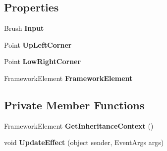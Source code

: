 \subsection*{Properties}
\begin{DoxyCompactItemize}
\item 
\mbox{\label{class_wpf_handler_1_1_u_i_1_1_effects_1_1_rect_blur_effect_ab0fee53cfe9bd6fd6a3ba991a2c024a3}} 
Brush {\bfseries Input}
\item 
\mbox{\label{class_wpf_handler_1_1_u_i_1_1_effects_1_1_rect_blur_effect_a7a8ff424f98797d72aa8acea72f45b89}} 
Point {\bfseries Up\+Left\+Corner}
\item 
\mbox{\label{class_wpf_handler_1_1_u_i_1_1_effects_1_1_rect_blur_effect_ab96f47536e8fe94f27c24072d1f462a5}} 
Point {\bfseries Low\+Right\+Corner}
\item 
\mbox{\label{class_wpf_handler_1_1_u_i_1_1_effects_1_1_rect_blur_effect_a16fb661a9b5f9f2c7a59eba0bca46198}} 
Framework\+Element {\bfseries Framework\+Element}
\end{DoxyCompactItemize}
\subsection*{Private Member Functions}
\begin{DoxyCompactItemize}
\item 
\mbox{\label{class_wpf_handler_1_1_u_i_1_1_effects_1_1_rect_blur_effect_aa60afd4d911b66bd47a6bbd8df16689a}} 
Framework\+Element {\bfseries Get\+Inheritance\+Context} ()
\item 
\mbox{\label{class_wpf_handler_1_1_u_i_1_1_effects_1_1_rect_blur_effect_a15ff012163044834cdf634a2282ab6ec}} 
void {\bfseries Update\+Effect} (object sender, Event\+Args args)
\end{DoxyCompactItemize}
